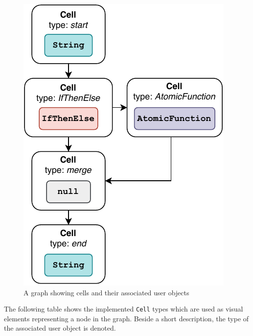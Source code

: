 \documentclass[a4paper,top=25mm,bottom=25mm,12pt,pdftex,halfparskip,twoside,bibtotoc,numbers=noenddot]{scrbook}
\begin{document}
\begin{figure}[H]
  \centering
  \vspace{0.5cm}
  \includegraphics[]{cell-user-objects}
  \caption{A graph showing cells and their associated user objects}
\end{figure}

\newpage

The following table shows the implemented \texttt{Cell} types which are used as visual elements representing a node in the graph. Beside a short description, the type of the associated user object is denoted.
\end{document}
